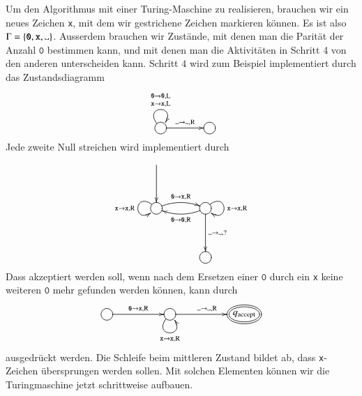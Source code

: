Um den Algorithmus mit einer Turing-Maschine zu realisieren, brauchen wir
ein neues Zeichen {\tt x}, mit dem wir gestrichene Zeichen markieren
können. Es ist also $\Gamma = \{\texttt{0},{\tt x},\blank\}$.
Ausserdem brauchen wir
Zustände, mit denen man die Parität der Anzahl $\texttt{0}$ bestimmen kann, und
mit denen man die Aktivitäten in Schritt 4 von den anderen unterscheiden
kann. Schritt $4$ wird zum Beispiel implementiert durch das
Zustandsdiagramm
\[
\entrymodifiers={++[o][F]}
\xymatrix @+5mm{
{}\ar@(ul,ur)^{\genfrac{}{}{0pt}{1}{\texttt{0}\to \texttt{0},\text{L}}{{\tt x}\to{\tt x},\text{L}}}
\ar[r]^{\blank\to\blank,\text{R}}
	&
}
\]
Jede zweite Null streichen wird implementiert durch
\[
\entrymodifiers={++[o][F]}
\xymatrix @+5mm{
*+\txt{}\ar[d]
\\
\ar@/^/[r]^{\texttt{0}\to{\tt x},\text{R}}
\ar@(ul,dl)_{\tt x\to\tt x,\text{R}}
	&\ar@/^/[l]^{\texttt{0}\to \texttt{0},\text{R}}
         \ar@(ur,dr)^{\tt x\to\tt x,\text{R}}
	 \ar[d]^{\blank\to\blank,?}
\\
*+\txt{}
	&{}
}
\]
Dass akzeptiert werden soll, wenn nach dem Ersetzen einer $\texttt{0}$ durch
ein {\tt x} keine weiteren $\texttt{0}$ mehr gefunden werden können, kann durch
\[
\entrymodifiers={++[o][F]}
\xymatrix @+10mm{
\ar[r]^{\texttt{0}\to{\tt x},\text{R}}
	&{} \ar@(dl,dr)_{{\tt x}\to{\tt x},\text{R}}
	    \ar[r]^{\blank\to\blank,\text{R}}
		&*++[o][F=]{q_{\text{accept}}}
}
\]
ausgedrückt werden. Die Schleife beim mittleren Zustand
bildet ab, dass {\tt x}-Zeichen übersprungen werden sollen.
Mit solchen Elementen können wir die Turingmaschine jetzt schrittweise
aufbauen.


